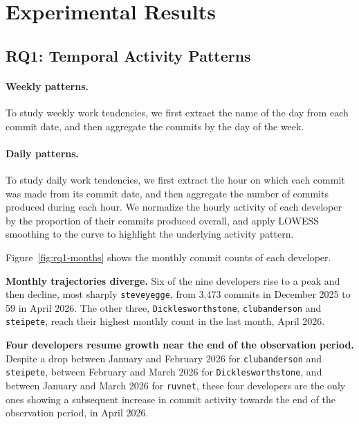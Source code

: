 \documentclass[smallextended]{svjour3}
\begin{document}

\section{Experimental Results}
\label{sec:results}

\subsection{RQ1: Temporal Activity Patterns}

\paragraph{Weekly patterns.}
To study weekly work tendencies, we first extract the name of the day from
each commit date, and then aggregate the commits by the day of the week.

\paragraph{Daily patterns.}
To study daily work tendencies, we first extract the hour on which each commit
was made from its commit date, and then aggregate the number of commits
produced during each hour. We normalize the hourly activity of each developer
by the proportion of their commits produced overall, and apply LOWESS
smoothing to the curve to highlight the underlying activity pattern.

Figure~\ref{fig:rq1-months} shows the monthly commit counts of each developer.

\textbf{Monthly trajectories diverge.} Six of the nine developers rise to a peak and then decline, most sharply \texttt{steveyegge}, from 3,473 commits in December 2025 to 59 in April 2026.
The other three, \texttt{Dicklesworthstone}, \texttt{clubanderson} and \texttt{steipete}, reach their highest monthly count in the last month, April 2026.


\textbf{Four developers resume growth near the end of the observation period.}
Despite a drop between January and February 2026 for \texttt{clubanderson} and
\texttt{steipete}, between February and March 2026 for \texttt{Dicklesworthstone}, and between January and March 2026 for \texttt{ruvnet}, these
four developers are the only ones showing a subsequent increase in commit
activity towards the end of the observation period, \ie in April 2026.
\end{document}
